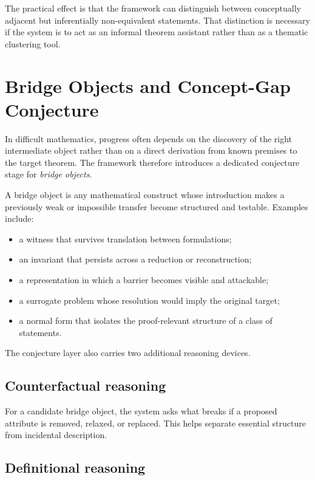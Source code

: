 \documentclass[11pt]{article}
\begin{document}
The practical effect is that the framework can distinguish between conceptually adjacent but inferentially non-equivalent statements. That distinction is necessary if the system is to act as an informal theorem assistant rather than as a thematic clustering tool.

\section{Bridge Objects and Concept-Gap Conjecture}

In difficult mathematics, progress often depends on the discovery of the right intermediate object rather than on a direct derivation from known premises to the target theorem. The framework therefore introduces a dedicated conjecture stage for \emph{bridge objects}.

A bridge object is any mathematical construct whose introduction makes a previously weak or impossible transfer become structured and testable. Examples include:

\begin{itemize}[leftmargin=*,itemsep=0.2em]
\item a witness that survives translation between formulations;
\item an invariant that persists across a reduction or reconstruction;
\item a representation in which a barrier becomes visible and attackable;
\item a surrogate problem whose resolution would imply the original target;
\item a normal form that isolates the proof-relevant structure of a class of statements.
\end{itemize}

The conjecture layer also carries two additional reasoning devices.

\subsection{Counterfactual reasoning}

For a candidate bridge object, the system asks what breaks if a proposed attribute is removed, relaxed, or replaced. This helps separate essential structure from incidental description.

\subsection{Definitional reasoning}
\end{document}
